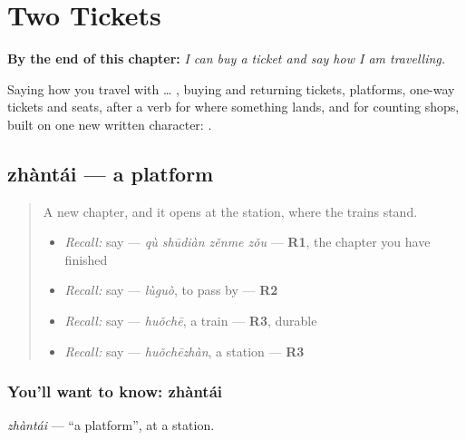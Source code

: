 
\chapter{Two Tickets}
\label{ch:zh-two-tickets}

\begin{chapteropening}
\textbf{By the end of this chapter:} \emph{I can buy a ticket and say how I am travelling.}

Saying how you travel with  … , buying and returning tickets, platforms, one-way tickets and seats,  after a verb for where something lands, and  for counting shops, built on one new written character: .
\end{chapteropening}

\section[zhàntái]{zhàntái — a platform}

\label{lesson:ZH-C284-zhantai}



\begin{quote}
A new chapter, and it opens at the station, where the trains stand.

\begin{itemize}
\raggedright
  \item \emph{Recall:} say  — \emph{qù shūdiàn zěnme zǒu} — \textbf{R1}, the chapter you have finished
  \item \emph{Recall:} say  — \emph{lùguò}, to pass by — \textbf{R2}
  \item \emph{Recall:} say  — \emph{huǒchē}, a train — \textbf{R3}, durable
  \item \emph{Recall:} say  — \emph{huǒchēzhàn}, a station — \textbf{R3}
\end{itemize}
\end{quote}

\subsection*{You'll want to know: zhàntái}
\emph{zhàntái} — \textquotedblleft{}a platform\textquotedblright{}, at a station.

